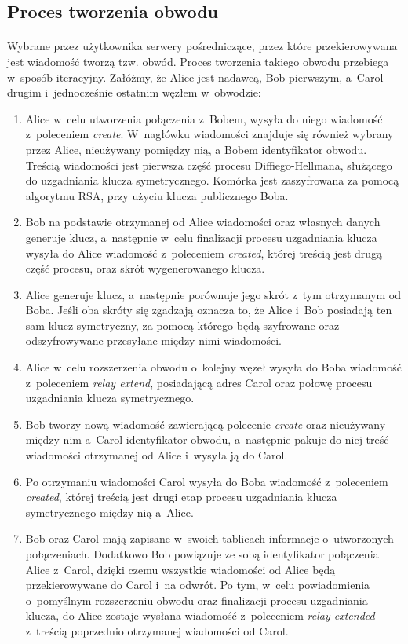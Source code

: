 \subsection{Proces tworzenia obwodu}\paragraph{}
Wybrane przez użytkownika serwery pośredniczące, przez które przekierowywana jest wiadomość tworzą tzw. obwód. Proces tworzenia takiego obwodu przebiega w~sposób iteracyjny. Załóżmy, że Alice jest nadawcą, Bob pierwszym, a~Carol drugim i~jednocześnie ostatnim węzłem w~obwodzie:
\begin{enumerate}
 \item Alice w~celu utworzenia połączenia z~Bobem, wysyła do niego wiadomość z~poleceniem \textit{create}. W~nagłówku wiadomości znajduje się również wybrany przez Alice, nieużywany pomiędzy nią, a Bobem identyfikator obwodu. Treścią wiadomości jest pierwsza część procesu  Diffiego-Hellmana, służącego do uzgadniania klucza symetrycznego. Komórka jest zaszyfrowana za pomocą algorytmu RSA, przy użyciu klucza publicznego Boba.
 \item Bob na podstawie otrzymanej od Alice wiadomości oraz własnych danych generuje klucz, a~następnie w~celu finalizacji procesu uzgadniania klucza wysyła do Alice wiadomość z~poleceniem \textit{created}, której treścią jest drugą część procesu, oraz skrót wygenerowanego klucza.
 \item Alice generuje klucz, a~następnie porównuje jego skrót z~tym otrzymanym od Boba. Jeśli oba skróty się zgadzają oznacza to, że Alice i~Bob posiadają ten sam klucz symetryczny, za pomocą którego będą szyfrowane oraz odszyfrowywane przesyłane między nimi wiadomości.
 \item Alice w~celu rozszerzenia obwodu o~kolejny węzeł wysyła do Boba wiadomość z~poleceniem \textit{relay extend}, posiadającą adres Carol oraz połowę procesu uzgadniania klucza symetrycznego.
 \item Bob tworzy nową wiadomość zawierającą polecenie \textit{create} oraz nieużywany między nim a~Carol identyfikator obwodu, a~następnie pakuje do niej treść wiadomości otrzymanej od Alice i~wysyła ją do Carol.
 \item Po otrzymaniu wiadomości Carol wysyła do Boba wiadomość z~poleceniem \textit{created}, której treścią jest drugi etap procesu uzgadniania klucza symetrycznego między nią a~Alice.
 \item Bob oraz Carol mają zapisane w~swoich tablicach informacje o~utworzonych połączeniach. Dodatkowo Bob powiązuje ze sobą identyfikator połączenia Alice z~Carol, dzięki czemu wszystkie wiadomości od Alice będą przekierowywane do Carol i~na odwrót\cite{hiding_routing_information}. Po tym, w~celu powiadomienia o~pomyślnym rozszerzeniu obwodu oraz finalizacji procesu uzgadniania klucza, do Alice zostaje wysłana wiadomość z~poleceniem \textit{relay extended} z~treścią poprzednio otrzymanej wiadomości od Carol.

\end{enumerate}
